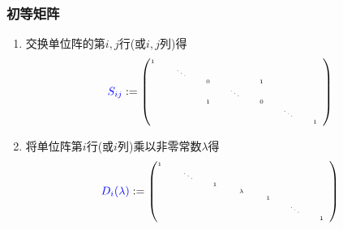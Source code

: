 \begin{frame}\frametitle{初等矩阵}
\begin{definition}[初等矩阵]
\begin{enumerate}
\item 交换单位阵的第$i,j$行(或$i,j$列)得
\[\tiny \blue{S_{ij}} := \begin{pmatrix}
1\quad&\qquad&\qquad&\qquad&\qquad&\qquad&\qquad\\
  &\ddots&      &      &      &      &     \\
  &      &  0   &      &  1   &      &     \\
  &      &      &\ddots&      &      &     \\
  &      &  1   &      &  0   &      &     \\
  &      &      &      &      &\ddots&     \\
  &      &      &      &      &      &  1  \\

\end{pmatrix}\]
\pp
\item 将单位阵第$i$行(或$i$列)乘以非零常数$\lambda$得
\[\tiny \blue{D_i(\lambda)} :=\begin{pmatrix}
1\quad&\qquad&\qquad&\qquad&\qquad&\qquad&\qquad\\
&\ddots&      &       &      &      &     \\
&      &  1   &       &      &      &     \\
&      &      &\lambda&      &      &     \\
&      &      &       &  1   &      &     \\
&      &      &       &      &\ddots&     \\
&      &      &       &      &      &  1  \\
\end{pmatrix}\]
\end{enumerate}
\end{definition}
\end{frame}





